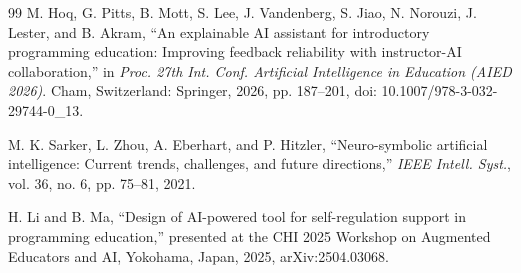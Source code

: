 \documentclass[journal]{IEEEtran}
\begin{document}
\begin{thebibliography}{99}
M. Hoq, G. Pitts, B. Mott, S. Lee, J. Vandenberg, S. Jiao, N.
Norouzi, J. Lester, and B. Akram, ``An explainable AI assistant for
introductory programming education: Improving feedback reliability with
instructor-AI collaboration,'' in \emph{Proc. 27th Int. Conf. Artificial
Intelligence in Education (AIED 2026)}. Cham, Switzerland: Springer, 2026,
pp. 187--201, doi: 10.1007/978-3-032-29744-0\_13.

M. K. Sarker, L. Zhou, A. Eberhart, and P. Hitzler,
``Neuro-symbolic artificial intelligence: Current trends, challenges, and
future directions,'' \emph{IEEE Intell. Syst.}, vol. 36, no. 6, pp.
75--81, 2021.

H. Li and B. Ma, ``Design of AI-powered tool for self-regulation support
in programming education,'' presented at the CHI 2025 Workshop on Augmented
Educators and AI, Yokohama, Japan, 2025, arXiv:2504.03068.
\end{thebibliography}
\end{document}
